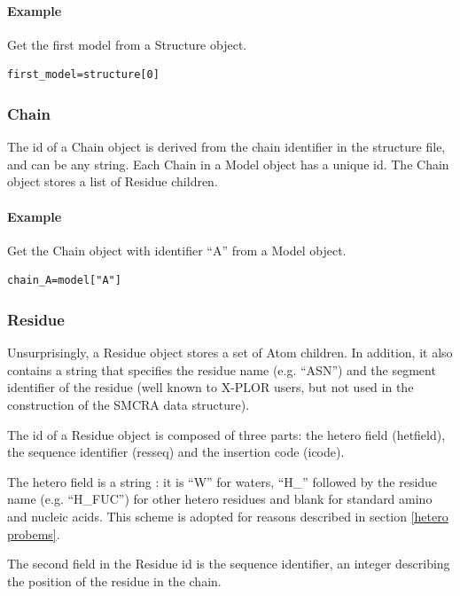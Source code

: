 \documentclass{report}
\begin{document}
\paragraph{Example}

Get the first model from a Structure object.

\begin{verbatim}
first_model=structure[0]
\end{verbatim}

\subsubsection{Chain}

The id of a Chain object is derived from the chain identifier in the structure
file, and can be any string. Each Chain in a Model object has a unique id. The
Chain object stores a list of Residue children. 


\paragraph{Example}

Get the Chain object with identifier {}``A{}'' from a Model object.

\begin{verbatim}
chain_A=model["A"]
\end{verbatim}

\subsubsection{Residue}

Unsurprisingly, a Residue object stores a set of Atom children. In addition,
it also contains a string that specifies the residue name (e.g. {}``ASN{}'')
and the segment identifier of the residue (well known to X-PLOR users, but not
used in the construction of the SMCRA data structure). 

The id of a Residue object is composed of three parts: the hetero field (hetfield),
the sequence identifier (resseq) and the insertion code (icode). 

The hetero field is a string : it is {}``W{}'' for waters, {}``H\_{}'' followed
by the residue name (e.g. {}``H\_FUC{}'') for other hetero residues and blank
for standard amino and nucleic acids. This scheme is adopted for reasons described
in section \ref{hetero probems}.

The second field in the Residue id is the sequence identifier, an integer describing
the position of the residue in the chain.
\end{document}
